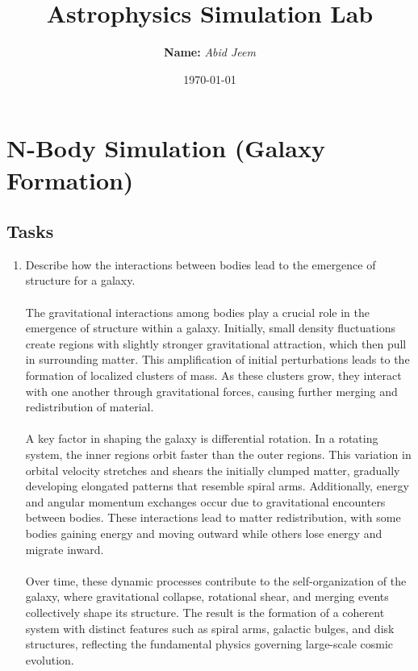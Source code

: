 \documentclass {article}
\title{Astrophysics Simulation Lab}
\author{\textbf{Name:} \textit{Abid Jeem}}
\date{\today}
\begin{document}
\maketitle
\section{N-Body Simulation (Galaxy Formation)}

\subsection{Tasks}
\begin{enumerate}
    \item Describe how the interactions between bodies lead to the emergence of structure for a galaxy.

    \paragraph{}
The gravitational interactions among bodies play a crucial role in the emergence of structure within a galaxy. Initially, small density fluctuations create regions with slightly stronger gravitational attraction, which then pull in surrounding matter. This amplification of initial perturbations leads to the formation of localized clusters of mass. As these clusters grow, they interact with one another through gravitational forces, causing further merging and redistribution of material.

\paragraph{}
A key factor in shaping the galaxy is differential rotation. In a rotating system, the inner regions orbit faster than the outer regions. This variation in orbital velocity stretches and shears the initially clumped matter, gradually developing elongated patterns that resemble spiral arms. Additionally, energy and angular momentum exchanges occur due to gravitational encounters between bodies. These interactions lead to matter redistribution, with some bodies gaining energy and moving outward while others lose energy and migrate inward.

\paragraph{}
Over time, these dynamic processes contribute to the self-organization of the galaxy, where gravitational collapse, rotational shear, and merging events collectively shape its structure. The result is the formation of a coherent system with distinct features such as spiral arms, galactic bulges, and disk structures, reflecting the fundamental physics governing large-scale cosmic evolution.

\end{enumerate}
\end{document}
